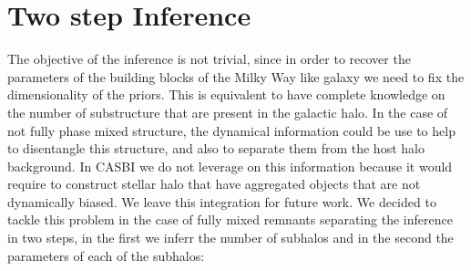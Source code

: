 \section{Two step Inference}\label{sec:Two step Inference}
The objective of the inference is not trivial, since in order to recover the parameters of the building blocks of the Milky Way like galaxy we need to fix the dimensionality of the priors. This is equivalent to have complete knowledge on the number of substructure that are present in the galactic halo. In the case of not fully phase mixed structure, the dynamical information could be use to help to disentangle this structure, and also to separate them from the host halo background. In CASBI we do not leverage on this information because it would require to construct stellar halo that have aggregated objects that are not dynamically biased. We leave this integration for future work. We decided to tackle this problem in the case of fully mixed remnants separating the inference in two steps, in the first we inferr the number of subhalos and in the second the parameters of each of the subhalos:
